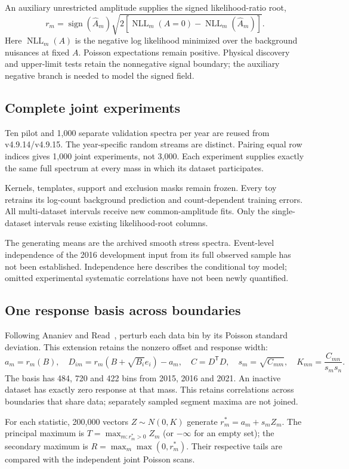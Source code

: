 \documentclass[11pt]{article}
\begin{document}
An auxiliary unrestricted amplitude supplies the signed likelihood-ratio root,
\[
 r_m=\operatorname{sign}(\widehat A_m)
 \sqrt{2\left[\operatorname{NLL}_m(A=0)-\operatorname{NLL}_m(\widehat A_m)\right]}.
\]
Here $\operatorname{NLL}_m(A)$ is the negative log likelihood minimized over the background nuisances at fixed $A$. Poisson expectations remain positive. Physical discovery and upper-limit tests retain the nonnegative signal boundary; the auxiliary negative branch is needed to model the signed field.

\subsection*{Complete joint experiments}
Ten pilot and 1,000 separate validation spectra per year are reused from v4.9.14/v4.9.15. The year-specific random streams are distinct. Pairing equal row indices gives 1,000 joint experiments, not 3,000. Each experiment supplies exactly the same full spectrum at every mass in which its dataset participates.

Kernels, templates, support and exclusion masks remain frozen. Every toy retrains its log-count background prediction and count-dependent training errors. All multi-dataset intervals receive new common-amplitude fits. Only the single-dataset intervals reuse existing likelihood-root columns.

The generating means are the archived smooth stress spectra. Event-level independence of the 2016 development input from its full observed sample has not been established. Independence here describes the conditional toy model; omitted experimental systematic correlations have not been newly quantified.

\subsection*{One response basis across boundaries}
Following Ananiev and Read~\cite{ananiev}, perturb each data bin by its Poisson standard deviation. This extension retains the nonzero offset and response width:
\[
 a_m=r_m(B),\quad D_{im}=r_m(B+\sqrt{B_i}e_i)-a_m,\quad
 C=D^{\mathsf T}D,\quad s_m=\sqrt{C_{mm}},\quad K_{mn}=\frac{C_{mn}}{s_ms_n}.
\]
The basis has 484, 720 and 422 bins from 2015, 2016 and 2021. An inactive dataset has exactly zero response at that mass. This retains correlations across boundaries that share data; separately sampled segment maxima are not joined.

For each statistic, 200,000 vectors $Z\sim N(0,K)$ generate $r_m^*=a_m+s_mZ_m$. The principal maximum is $T=\max_{m:r_m^*>0}Z_m$ (or $-\infty$ for an empty set); the secondary maximum is $R=\max_m\max(0,r_m^*)$. Their respective tails are compared with the independent joint Poisson scans.
\end{document}
